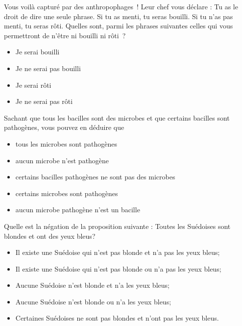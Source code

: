 \documentclass[12pt,french,oneside,a4paper]{memoir} %
\begin{document}
\begin{exo}
Vous voilà capturé par des anthropophages~! Leur chef vous
déclare : \og Tu as le droit de dire une seule phrase. Si tu as menti, tu
seras bouilli. Si tu n'as pas menti, tu seras rôti\fg{}. Quelles sont, parmi
les phrases suivantes celles qui vous permettront de n'être ni bouilli ni
rôti~?

\begin{itemize}
\item Je serai bouilli
\item Je ne serai pas bouilli
\item Je serai rôti
\item Je ne serai pas rôti
\end{itemize}
\end{exo}

\begin{exo}
Sachant que tous les bacilles sont des microbes et que certains bacilles sont
pathogènes, vous pouvez en déduire que

\begin{itemize}
\item tous les microbes sont pathogènes
\item aucun microbe n'est pathogène
\item certains bacilles pathogènes ne sont pas des microbes
\item certains microbes sont pathogènes
\item aucun microbe pathogène n'est un bacille
\end{itemize}
\end{exo}

\begin{exo}
Quelle est la négation de la proposition suivante : \og Toutes les Suédoises
sont blondes et ont des yeux bleus\fg{}?

\begin{itemize}
\item Il existe une Suédoise qui n'est pas blonde et n'a pas les yeux bleus;
\item Il existe une Suédoise qui n'est pas blonde ou n'a pas les yeux bleus;
\item Aucune Suédoise n'est blonde et n'a les yeux bleus;
\item Aucune Suédoise n'est blonde ou n'a les yeux bleus;
\item Certaines Suédoises ne sont pas blondes et n'ont pas les yeux bleus.
\end{itemize}
\end{exo}
\end{document}
